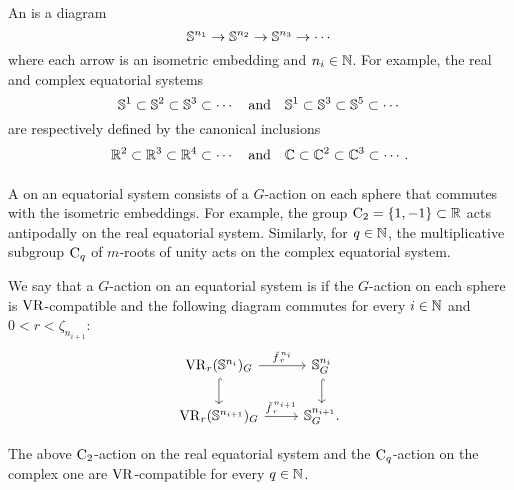 \subsubsection{}
\label{subsub:VR-compatible-system}
An  is a diagram
\[
\mathbb{S}^{n_1} \to \mathbb{S}^{n_2} \to \mathbb{S}^{n_3} \to \dotsb
\]
where each arrow is an isometric embedding and $n_i \in \mathbb{N}$.
For example, the real and complex equatorial systems
\[
\mathbb{S}^1 \subset \mathbb{S}^2 \subset \mathbb{S}^3 \subset \dotsb
\quad\text{and}\quad
\mathbb{S}^1 \subset \mathbb{S}^3 \subset \mathbb{S}^5 \subset \dotsb
\]
are respectively defined by the canonical inclusions
\[
\mathbb{R}^2 \subset \mathbb{R}^3 \subset \mathbb{R}^4 \subset \dotsb
\quad\text{and}\quad
\mathbb{C} \subset \mathbb{C}^2 \subset \mathbb{C}^3 \subset \dotsb.
\]

\subsubsection{}
\label{subsub:system VR compatible}

A  on an equatorial system consists of a \(G\)-action on each sphere that commutes with the isometric embeddings.
For example, the group \(\mathrm{C}_2 = \{1,-1\} \subset \mathbb{R}\) acts antipodally on the real equatorial system.
Similarly, for \(q \in \mathbb{N}\), the multiplicative subgroup \(\mathrm{C}_q\) of \(m\)-roots of unity acts on the complex equatorial system.

We say that a \(G\)-action on an equatorial system is  if the \(G\)-action on each sphere is \(\mathrm{VR}\)-compatible and the following diagram commutes for every \(i \in \mathbb{N}\) and $0 < r < \zeta_{n_{i+1}}$:
\begin{equation}\label{eq:VR_quotient}
    \begin{tikzcd}
	\VR_r(\bS^{n_i})_G
	\ar[d, hook]
	\ar[r, "\tilde f_{\,r}^{\,n_i}" above]
	&
	\bS^{n_i}_G
	\ar[d, hook]
	\\
	\VR_r(\bS^{n_{i+1}})_G
	\ar[r, "\tilde f_{\,r}^{\,n_{i+1}}" above]
	&
	\bS^{n_{i+1}}_G.
\end{tikzcd}
\end{equation}



\lemma The above \(\mathrm{C}_2\)-action on the real equatorial system and the \(\mathrm{C}_q\)-action on the complex one are \(\mathrm{VR}\)-compatible for every \(q \in \mathbb{N}\).

